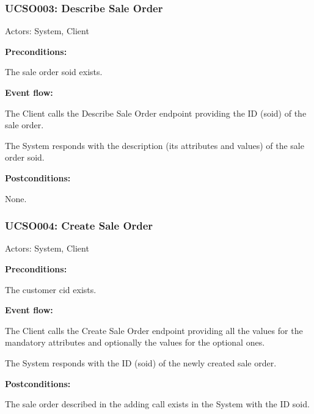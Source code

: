 \begin{ucbox}{\subsubsection{UCSO003: Describe Sale Order}}
\label{UCSO003}

Actors: System, Client

\textbf{Preconditions:}

\ucitem The sale order soid exists.

\textbf{Event flow:}

\ucitem The Client calls the Describe Sale Order endpoint providing the ID (soid) of the sale order.

\ucitem The System responds with the description (its attributes and values) of the sale order soid.

\textbf{Postconditions:}

\ucitem None.

\end{ucbox}

\begin{ucbox}{\subsubsection{UCSO004: Create Sale Order}}
\label{UCSO004}

Actors: System, Client

\textbf{Preconditions:}

\ucitem The customer cid exists.

\textbf{Event flow:}

\ucitem The Client calls the Create Sale Order endpoint providing all the values for the mandatory attributes and optionally the values for the optional ones.

\ucitem The System responds with the ID (soid) of the newly created sale order.

\textbf{Postconditions:}

\ucitem The sale order described in the adding call exists in the System with the ID soid.

\end{ucbox}

